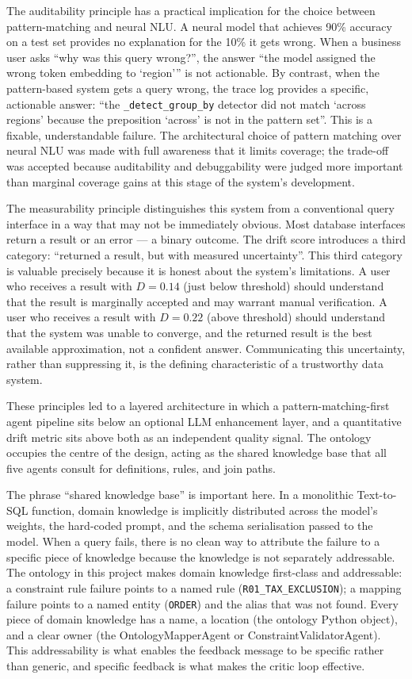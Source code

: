 \documentclass[12pt,a4paper]{report}
\begin{document}
The auditability principle has a practical implication for the choice between pattern-matching and neural NLU. A neural model that achieves 90\% accuracy on a test set provides no explanation for the 10\% it gets wrong. When a business user asks ``why was this query wrong?'', the answer ``the model assigned the wrong token embedding to `region''' is not actionable. By contrast, when the pattern-based system gets a query wrong, the trace log provides a specific, actionable answer: ``the \texttt{\_detect\_group\_by} detector did not match `across regions' because the preposition `across' is not in the pattern set''. This is a fixable, understandable failure. The architectural choice of pattern matching over neural NLU was made with full awareness that it limits coverage; the trade-off was accepted because auditability and debuggability were judged more important than marginal coverage gains at this stage of the system's development.

The measurability principle distinguishes this system from a conventional query interface in a way that may not be immediately obvious. Most database interfaces return a result or an error — a binary outcome. The drift score introduces a third category: ``returned a result, but with measured uncertainty''. This third category is valuable precisely because it is honest about the system's limitations. A user who receives a result with $D = 0.14$ (just below threshold) should understand that the result is marginally accepted and may warrant manual verification. A user who receives a result with $D = 0.22$ (above threshold) should understand that the system was unable to converge, and the returned result is the best available approximation, not a confident answer. Communicating this uncertainty, rather than suppressing it, is the defining characteristic of a trustworthy data system.

These principles led to a layered architecture in which a pattern-matching-first agent pipeline sits below an optional \ac{LLM} enhancement layer, and a quantitative drift metric sits above both as an independent quality signal. The ontology occupies the centre of the design, acting as the shared knowledge base that all five agents consult for definitions, rules, and join paths.

The phrase ``shared knowledge base'' is important here. In a monolithic Text-to-SQL function, domain knowledge is implicitly distributed across the model's weights, the hard-coded prompt, and the schema serialisation passed to the model. When a query fails, there is no clean way to attribute the failure to a specific piece of knowledge because the knowledge is not separately addressable. The ontology in this project makes domain knowledge first-class and addressable: a constraint rule failure points to a named rule (\texttt{R01\_TAX\_EXCLUSION}); a mapping failure points to a named entity (\texttt{ORDER}) and the alias that was not found. Every piece of domain knowledge has a name, a location (the ontology Python object), and a clear owner (the OntologyMapperAgent or ConstraintValidatorAgent). This addressability is what enables the feedback message to be specific rather than generic, and specific feedback is what makes the critic loop effective.
\end{document}
